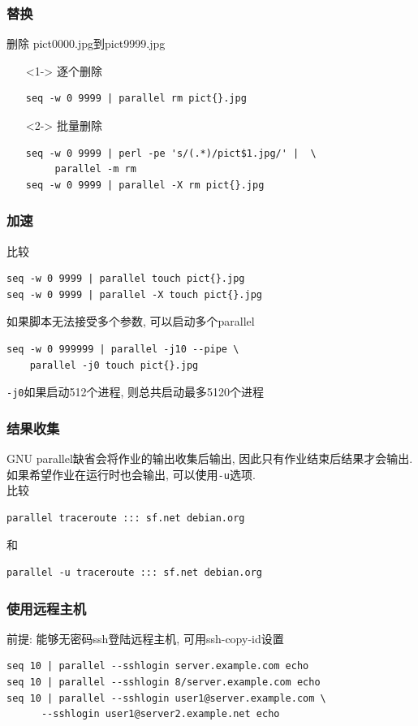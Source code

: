 \documentclass[compress]{beamer}
\begin{document}
\begin{frame}[fragile]
    \frametitle{替换}
删除 pict0000.jpg到pict9999.jpg
\begin{itemize}
\item [] <1-> 逐个删除 \\
\begin{Verbatim}
seq -w 0 9999 | parallel rm pict{}.jpg 
\end{Verbatim}
\item [] <2-> 批量删除 \\
\begin{Verbatim}
seq -w 0 9999 | perl -pe 's/(.*)/pict$1.jpg/' |  \
     parallel -m rm
seq -w 0 9999 | parallel -X rm pict{}.jpg
\end{Verbatim}
\end{itemize}
\end{frame}

\begin{frame}[fragile]
    \frametitle{加速}
\noindent 比较
\begin{Verbatim}
seq -w 0 9999 | parallel touch pict{}.jpg
seq -w 0 9999 | parallel -X touch pict{}.jpg
\end{Verbatim}
\noindent 如果脚本无法接受多个参数, 可以启动多个parallel
\begin{Verbatim}
seq -w 0 999999 | parallel -j10 --pipe \
    parallel -j0 touch pict{}.jpg
\end{Verbatim}
\verb~-j0~如果启动512个进程, 则总共启动最多5120个进程
\end{frame}


\begin{frame}[fragile]
    \frametitle{结果收集}
GNU parallel缺省会将作业的输出收集后输出, 因此只有作业结束后结果才会输出. 如果希望作业在运行时也会输出, 可以使用\verb~-u~选项.\\

比较
\begin{Verbatim}
parallel traceroute ::: sf.net debian.org
\end{Verbatim}
和
\begin{Verbatim}
parallel -u traceroute ::: sf.net debian.org
\end{Verbatim}
\end{frame}

\begin{frame}[fragile]
    \frametitle{使用远程主机}
\alert{前提: 能够无密码ssh登陆远程主机, 可用ssh-copy-id设置}    
\begin{Verbatim}
seq 10 | parallel --sshlogin server.example.com echo
seq 10 | parallel --sshlogin 8/server.example.com echo
seq 10 | parallel --sshlogin user1@server.example.com \
      --sshlogin user1@server2.example.net echo
\end{Verbatim}
\end{frame}
\end{document}
